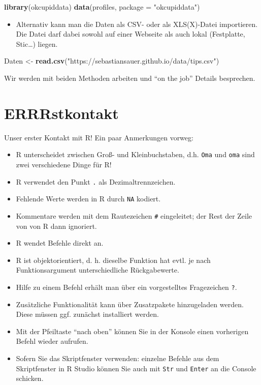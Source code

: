 \documentclass[12pt,]{book}
\newenvironment{Shaded}{\begin{snugshade}}{\end{snugshade}}
\newcommand{\KeywordTok}[1]{\textcolor[rgb]{0.13,0.29,0.53}{\textbf{{#1}}}}
\newcommand{\DataTypeTok}[1]{\textcolor[rgb]{0.13,0.29,0.53}{{#1}}}
\newcommand{\StringTok}[1]{\textcolor[rgb]{0.31,0.60,0.02}{{#1}}}
\newcommand{\NormalTok}[1]{{#1}}
\providecommand{\tightlist}{%
  \setlength{\itemsep}{0pt}\setlength{\parskip}{0pt}}
\begin{document}
\begin{Shaded}
\begin{Highlighting}[]
\KeywordTok{library}\NormalTok{(okcupiddata) }\KeywordTok{data}\NormalTok{(profiles, }\DataTypeTok{package =} \StringTok{"okcupiddata"}\NormalTok{)}
\end{Highlighting}
\end{Shaded}

\begin{itemize}
\tightlist
\item
  Alternativ kann man die Daten als CSV- oder als XLS(X)-Datei
  importieren. Die Datei darf dabei sowohl auf einer Webseite als auch
  lokal (Festplatte, Stic\ldots{}) liegen.
\end{itemize}

\begin{Shaded}
\begin{Highlighting}[]
\NormalTok{Daten <-}\StringTok{ }
\KeywordTok{read.csv}\NormalTok{(}\StringTok{"https://sebastiansauer.github.io/data/tips.csv"}\NormalTok{) }
\end{Highlighting}
\end{Shaded}

Wir werden mit beiden Methoden arbeiten und ``on the job'' Details
besprechen.

\section{ERRRstkontakt}\label{errrstkontakt}

Unser erster Kontakt mit R! Ein paar Anmerkungen vorweg:

\begin{itemize}
\tightlist
\item
  R unterscheidet zwischen Groß- und Kleinbuchstaben, d.h. \texttt{Oma}
  und \texttt{oma} sind zwei verschiedene Dinge für R!
\item
  R verwendet den Punkt \texttt{.} als Dezimaltrennzeichen.
\item
  Fehlende Werte werden in R durch \texttt{NA} kodiert.
\item
  Kommentare werden mit dem Rautezeichen \texttt{\#} eingeleitet; der
  Rest der Zeile von von R dann ignoriert.
\item
  R wendet Befehle direkt an.
\item
  R ist objektorientiert, d. h. dieselbe Funktion hat evtl. je nach
  Funktionsargument unterschiedliche Rückgabewerte.
\item
  Hilfe zu einem Befehl erhält man über ein vorgestelltes Fragezeichen
  \texttt{?}.
\item
  Zusätzliche Funktionalität kann über Zusatzpakete hinzugeladen werden.
  Diese müssen ggf. zunächst installiert werden.
\item
  Mit der Pfeiltaste ``nach oben'' können Sie in der Konsole einen
  vorherigen Befehl wieder aufrufen.
\item
  Sofern Sie das Skriptfenster verwenden: einzelne Befehle aus dem
  Skriptfenster in R Studio können Sie auch mit \texttt{Str} und
  \texttt{Enter} an die Console schicken.
\end{itemize}
\end{document}
